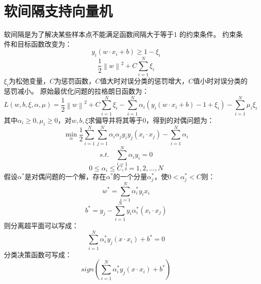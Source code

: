 \documentclass{article}
\begin{document}
	\section{软间隔支持向量机}
	软间隔是为了解决某些样本点不能满足函数间隔大于等于1 的约束条件。
	约束条件和目标函数改变为：
	\begin{equation}
	y_{i}\left ( w\cdot x_{i}+b \right )\geq 1-\xi _{i}
	\end{equation}
	\begin{equation}
	\frac{1}{2}\left \| w \right \|^{2}+C\sum_{i=1}^{N}\xi _{i}
	\end{equation}
	$\xi _{i}$为松弛变量，$C$为惩罚函数，$C$值大时对误分类的惩罚增大，$C$值小时对误分类的惩罚减小。
	原始最优化问题的拉格朗日函数为：
	\begin{equation}
	L\left ( w ,b ,\xi , \alpha ,\mu  \right )=\frac{1}{2}\left \| w \right \|^{2}+C\sum_{i=1}^{N}\xi _{i}-\sum_{i=1}^{N}\alpha _{i}\left ( y_{i}\left ( w\cdot x_{i}+b \right )-1+\xi _{i} \right )-\sum_{i=1}^{N}\mu _{i}\xi _{i}
	\end{equation}
	其中$\alpha _{i}\geq 0,\mu _{i}\geq 0$，对$w,b,\xi $求偏导并将其等于0，得到的对偶问题为：
	\begin{equation}
	\mathop{min}_{\alpha }\frac{1}{2}\sum_{i=1}^{N}\sum_{j=1}^{N}\alpha _{i}\alpha _{j}y_{i}y_{j}\left ( x_{i}\cdot x_{j} \right )-\sum_{i=1}^{N}\alpha _{i}
	\end{equation}
	\begin{equation}
	s.t. \quad \sum_{i=1}^{N}\alpha _{i}y_{i}=0
	\end{equation}
	\begin{equation}
	0\leq \alpha _{i}\leq C,i=1,2,\ldots,N
	\end{equation}
	假设$ \alpha ^{*}$是对偶问题的一个解，存在$ \alpha ^{*}$的一个分量$ \alpha ^{*}_{j}$，使$0< \alpha ^{*}_{j}<C$则：
	\begin{equation}
	w^{*}=\sum_{i=1}^{N}\alpha _{i}^{*}y_{i}x_{i}
	\end{equation}
	\begin{equation}
	b^{*}=y_{j}-\sum_{i=1}^{N}y_{i}\alpha _{i}^{*}\left ( x_{i}\cdot x_{j} \right )
	\end{equation}
	则分离超平面可以写成：
	\begin{equation}
	\sum_{i=1}^{N}\alpha _{i}^{*}y_{j}\left ( x\cdot x_{i} \right )+b^{*}=0
	\end{equation}
	分类决策函数可写成：
	\begin{equation}
	sign(\sum_{i=1}^{N}\alpha _{i}^{*}y_{j}\left ( x\cdot x_{i} \right )+b^{*})
	\end{equation}
\end{document}
